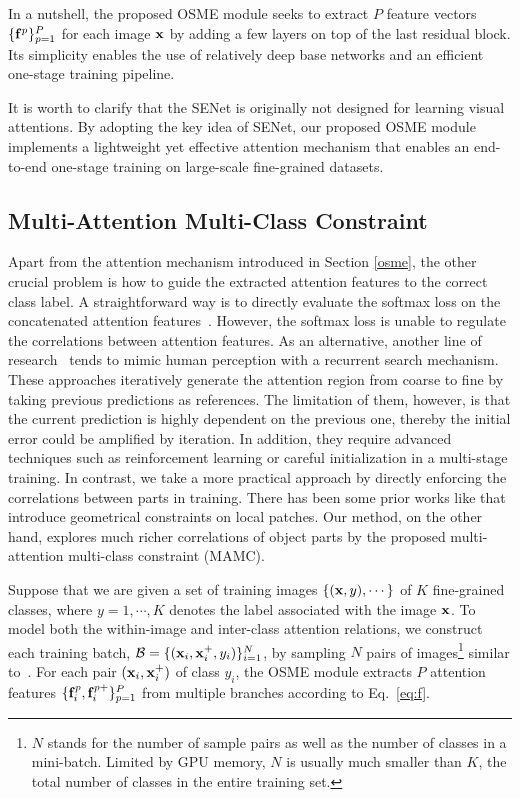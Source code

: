 \documentclass[runningheads]{llncs}
\begin{document}
In a nutshell, the proposed OSME module seeks to extract $P$ feature vectors $\{\mathbf{f}^p\}_{p=1}^P$ for each image $\mathbf{x}$ by adding a few layers on top of the last residual block.
Its simplicity enables the use of relatively deep base networks and an efficient one-stage training pipeline.

It is worth to clarify that the SENet is originally not designed for learning visual attentions.
By adopting the key idea of SENet, our proposed OSME module implements a lightweight yet effective attention mechanism that enables an end-to-end one-stage training on large-scale fine-grained datasets.





\vspace{-.1in}
\subsection{Multi-Attention Multi-Class Constraint}
\label{mamc}

Apart from the attention mechanism introduced in Section \ref{osme}, the other crucial problem is how to guide the extracted attention features to the correct class label.
A straightforward way is to directly evaluate the softmax loss on the concatenated attention features~\cite{jaderberg2015spatial}.
However, the softmax loss is unable to regulate the correlations between attention features.
As an alternative, another line of research~\cite{MnihHGK14,liu2016fully,fu2017look} tends to mimic human perception with a recurrent search mechanism.
These approaches iteratively generate the attention region from coarse to fine by taking previous predictions as references.
The limitation of them, however, is that the current prediction is highly dependent on the previous one, thereby the initial error could be amplified by iteration.
In addition, they require advanced techniques such as reinforcement learning or careful initialization in a multi-stage training.
In contrast, we take a more practical approach by directly enforcing the correlations between parts in training.
There has been some prior works like \cite{wang2016mining} that introduce geometrical constraints on local patches.
Our method, on the other hand, explores much richer correlations of object parts by the proposed multi-attention multi-class constraint (MAMC).



Suppose that we are given a set of training images $\{(\mathbf{x}, y), \cdots\}$ of $K$ fine-grained classes, where $y = 1, \cdots, K$ denotes the label associated with the image $\mathbf{x}$.
To model both the within-image and inter-class attention relations, we construct each training batch, $\mathcal{B} = \{(\mathbf{x}_{i}, \mathbf{x}_{i}^+, y_i)\}_{i=1}^N$, by sampling $N$ pairs of images\footnote{$N$ stands for the number of sample pairs as well as the number of classes in a mini-batch. Limited by GPU memory, $N$ is usually much smaller than $K$, the total number of classes in the entire training set.} similar to~\cite{sohn2016improved}.
For each pair $(\mathbf{x}_i, \mathbf{x}_i^+)$ of class $y_i$,
the OSME module extracts $P$ attention features $\{\mathbf{f}_i^p, \mathbf{f}_i^{p+}\}_{p=1}^P$ from multiple branches according to Eq.~\ref{eq:f}.
\end{document}

